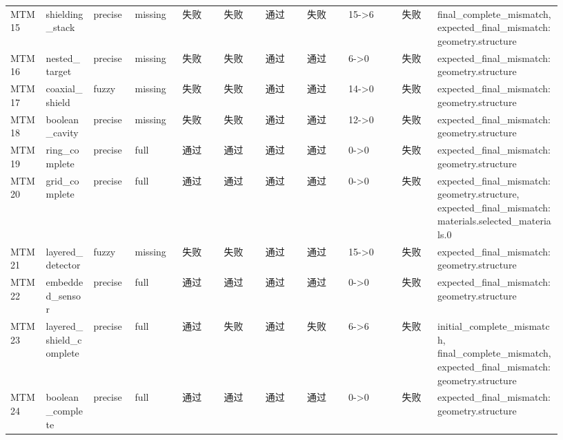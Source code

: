 \documentclass[11pt]{ctexart}
\begin{document}
\begin{longtable}{p{0.06\linewidth}p{0.08\linewidth}p{0.07\linewidth}p{0.08\linewidth}p{0.07\linewidth}p{0.07\linewidth}p{0.07\linewidth}p{0.07\linewidth}p{0.09\linewidth}p{0.06\linewidth}p{0.21\linewidth}}
MTM15 & shielding\_stack & precise & missing & 失败 & 失败 & 通过 & 失败 & 15->6 & 失败 & final\_complete\_mismatch, expected\_final\_mismatch:geometry.structure \\
MTM16 & nested\_target & precise & missing & 失败 & 失败 & 通过 & 通过 & 6->0 & 失败 & expected\_final\_mismatch:geometry.structure \\
MTM17 & coaxial\_shield & fuzzy & missing & 失败 & 失败 & 通过 & 通过 & 14->0 & 失败 & expected\_final\_mismatch:geometry.structure \\
MTM18 & boolean\_cavity & precise & missing & 失败 & 失败 & 通过 & 通过 & 12->0 & 失败 & expected\_final\_mismatch:geometry.structure \\
MTM19 & ring\_complete & precise & full & 通过 & 通过 & 通过 & 通过 & 0->0 & 失败 & expected\_final\_mismatch:geometry.structure \\
MTM20 & grid\_complete & precise & full & 通过 & 通过 & 通过 & 通过 & 0->0 & 失败 & expected\_final\_mismatch:geometry.structure, expected\_final\_mismatch:materials.selected\_materials.0 \\
MTM21 & layered\_detector & fuzzy & missing & 失败 & 失败 & 通过 & 通过 & 15->0 & 失败 & expected\_final\_mismatch:geometry.structure \\
MTM22 & embedded\_sensor & precise & full & 通过 & 通过 & 通过 & 通过 & 0->0 & 失败 & expected\_final\_mismatch:geometry.structure \\
MTM23 & layered\_shield\_complete & precise & full & 通过 & 失败 & 通过 & 失败 & 6->6 & 失败 & initial\_complete\_mismatch, final\_complete\_mismatch, expected\_final\_mismatch:geometry.structure \\
MTM24 & boolean\_complete & precise & full & 通过 & 通过 & 通过 & 通过 & 0->0 & 失败 & expected\_final\_mismatch:geometry.structure \\
\bottomrule
\end{longtable}
\end{document}
